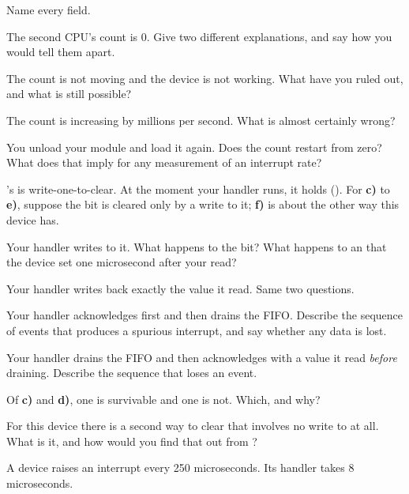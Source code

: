  Name every field.

 The second CPU's count is 0. Give two different explanations, and say how you would tell
them apart.

 The count is not moving and the device is not working. What have you ruled out, and what
is still possible?

 The count is increasing by millions per second. What is almost certainly wrong?

 You unload your module and load it again. Does the count restart from zero? What does that
imply for any measurement of an interrupt rate?

\label{c8:ex:3}

's  is write-one-to-clear. At the moment your handler runs, it holds
 (). For \textbf{c)} to \textbf{e)}, suppose the bit is cleared
only by a write to it; \textbf{f)} is about the other way this device has.

 Your handler writes  to it. What happens to the  bit? What
happens to an  that the device set one microsecond after your read?

 Your handler writes back exactly the value it read. Same two questions.

 Your handler acknowledges first and then drains the FIFO. Describe the sequence of events
that produces a spurious interrupt, and say whether any data is lost.

 Your handler drains the FIFO and then acknowledges with a value it read \emph{before}
draining. Describe the sequence that loses an event.

 Of \textbf{c)} and \textbf{d)}, one is survivable and one is not. Which, and why?

 For this device there is a second way to clear  that involves no write to
 at all. What is it, and how would you find that out from
?

\label{c8:ex:4}

A device raises an interrupt every 250 microseconds. Its handler takes 8 microseconds.

